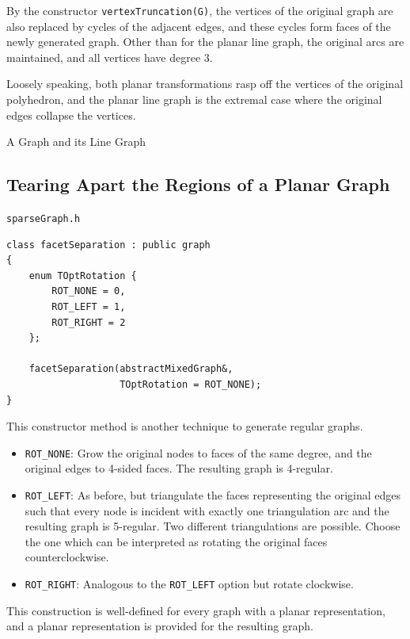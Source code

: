 \documentclass[a4paper,11pt,twoside]{book}
\begin{document}
\begin{multicols}{2}
By the constructor \verb/vertexTruncation(G)/, the vertices of the original graph
are also replaced by cycles of the adjacent edges, and these cycles form faces
of the newly generated graph. Other than for the planar line graph, the original
arcs are maintained, and all vertices have degree 3.

Loosely speaking, both planar transformations rasp off the vertices of the
original polyhedron, and the planar line graph is the extremal case where the
original edges collapse the vertices.


\bigskip
\begin{figurehere}
\begin{center}
\epsfxsize=3.5cm
\epsfxsize=3.5cm
\hspace*{2cm}
\vspace{0.5cm}
\caption{\label{flb_lgraph}A Graph and its Line Graph}
\end{center}
\end{figurehere}


\subsection{Tearing Apart the Regions of a Planar Graph}
\label{sbl_facet_separation}
\myinclude\verb/sparseGraph.h/
\begin{mymethods}
\begin{verbatim}
class facetSeparation : public graph
{
    enum TOptRotation {
        ROT_NONE = 0,
        ROT_LEFT = 1,
        ROT_RIGHT = 2
    };

    facetSeparation(abstractMixedGraph&,
                    TOptRotation = ROT_NONE);
}
\end{verbatim}
\end{mymethods}
This constructor method is another technique to generate regular
graphs.
\begin{itemize}
\item \verb/ROT_NONE/: Grow the original nodes to faces of the same degree,
    and the original edges to 4-sided faces. The resulting graph is 4-regular.
\item \verb/ROT_LEFT/: As before, but triangulate the faces representing the
    original edges such that every node is incident with exactly one
    triangulation arc and the resulting graph is 5-regular. Two different
    triangulations are possible. Choose the one which can be interpreted as
    rotating the original faces counterclockwise.
\item \verb/ROT_RIGHT/: Analogous to the \verb/ROT_LEFT/ option but rotate
    clockwise.
\end{itemize}
This construction is well-defined for every graph with a planar representation,
and a planar representation is provided for the resulting graph.


\end{multicols}
\end{document}
